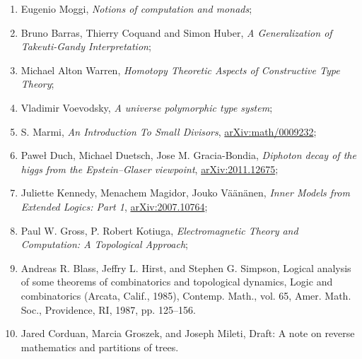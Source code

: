 \documentclass[a4paper,11pt]{article}
\begin{document}
\begin{enumerate}
\item Eugenio Moggi, \textit{Notions of computation and monads};



\item Bruno Barras, Thierry Coquand and Simon Huber, \textit{A
    Generalization of Takeuti-Gandy Interpretation};



\item Michael Alton Warren, \textit{Homotopy Theoretic Aspects of
    Constructive Type Theory};



\item Vladimir Voevodsky, \textit{A universe polymorphic type system};



\item S. Marmi, \textit{An Introduction To Small Divisors},
  \href{https://arxiv.org/abs/math/0009232v1}{arXiv:math/0009232};



\item Paweł Duch, Michael Duetsch, Jose M. Gracia-Bondia,
  \textit{Diphoton decay of the higgs from the Epstein--Glaser
    viewpoint},
  \href{https://arxiv.org/abs/2011.12675v2}{arXiv:2011.12675};



\item Juliette Kennedy, Menachem Magidor, Jouko V\"{a}\"{a}n\"{a}nen,
  \textit{Inner Models from Extended Logics: Part 1},
  \href{https://arxiv.org/abs/2007.10764}{arXiv:2007.10764};



\item Paul W. Gross, P. Robert Kotiuga, \textit{Electromagnetic Theory
    and Computation: A Topological Approach};



\item Andreas R. Blass, Jeffry L. Hirst, and Stephen G. Simpson,
  Logical analysis of some theorems of combinatorics and topological
  dynamics, Logic and combinatorics (Arcata, Calif., 1985), Contemp.
  Math., vol. 65, Amer. Math. Soc., Providence, RI, 1987, pp. 125–156.



\item Jared Corduan, Marcia Groszek, and Joseph Mileti, Draft: A note
  on reverse mathematics and partitions of trees.




\end{enumerate}
\end{document}
